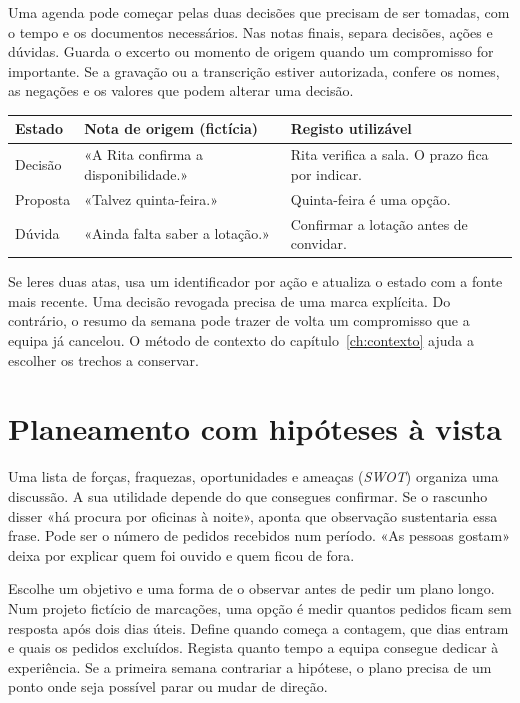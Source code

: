 Uma agenda pode começar pelas duas decisões que precisam de ser tomadas, com o tempo e os documentos necessários. Nas notas finais, separa decisões, ações e dúvidas. Guarda o excerto ou momento de origem quando um compromisso for importante. Se a gravação ou a transcrição estiver autorizada, confere os nomes, as negações e os valores que podem alterar uma decisão.

\begin{center}
\small
\begin{tabularx}{\textwidth}{@{}p{}XX@{}}
\toprule
Estado & Nota de origem (fictícia) & Registo utilizável \\
\midrule
Decisão & «A Rita confirma a disponibilidade.» & Rita verifica a sala. O prazo fica por indicar. \\
Proposta & «Talvez quinta-feira.» & Quinta-feira é uma opção. \\
Dúvida & «Ainda falta saber a lotação.» & Confirmar a lotação antes de convidar. \\
\bottomrule
\end{tabularx}
\end{center}

Se leres duas atas, usa um identificador por ação e atualiza o estado com a fonte mais recente. Uma decisão revogada precisa de uma marca explícita. Do contrário, o resumo da semana pode trazer de volta um compromisso que a equipa já cancelou. O método de contexto do capítulo~\ref{ch:contexto} ajuda a escolher os trechos a conservar.

\section{Planeamento com hipóteses à vista}

Uma lista de forças, fraquezas, oportunidades e ameaças (\emph{SWOT}) organiza uma discussão. A sua utilidade depende do que consegues confirmar. Se o rascunho disser «há procura por oficinas à noite», aponta que observação sustentaria essa frase. Pode ser o número de pedidos recebidos num período. «As pessoas gostam» deixa por explicar quem foi ouvido e quem ficou de fora.

Escolhe um objetivo e uma forma de o observar antes de pedir um plano longo. Num projeto fictício de marcações, uma opção é medir quantos pedidos ficam sem resposta após dois dias úteis. Define quando começa a contagem, que dias entram e quais os pedidos excluídos. Regista quanto tempo a equipa consegue dedicar à experiência. Se a primeira semana contrariar a hipótese, o plano precisa de um ponto onde seja possível parar ou mudar de direção.


